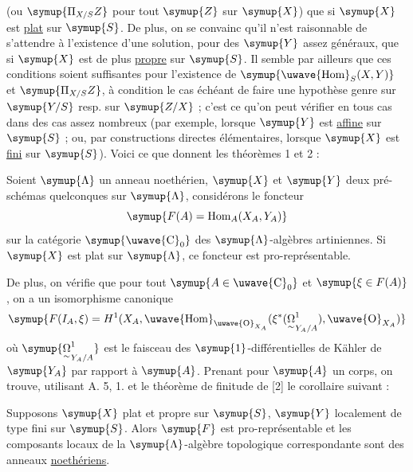 (ou $\symup{\Pi_{X/S}Z}$ pour tout $\symup{Z}$ sur $\symup{X}$) que si $\symup{X}$ est \uline{plat} sur $\symup{S}$. De plus,
on se convainc qu'il n'est raisonnable de s'attendre à l'existence d'une
solution, pour des $\symup{Y}$ assez généraux, que si $\symup{X}$ est de plus \uline{propre} sur $\symup{S}$.
Il semble par ailleurs que ces conditions soient suffisantes pour l'existence
de $\symup{\text{\uwave{Hom}}_S(X,Y)}$ et $\symup{\Pi_{X/S}Z}$, à condition le
cas échéant de faire une hypothèse genre  sur $\symup{Y/S}$ resp.
sur $\symup{Z/X}$ ; c'est ce qu'on peut vérifier en tous cas dans des cas assez
nombreux (par exemple, lorsque $\symup{Y}$ est \uline{affine} sur $\symup{S}$ ; ou, par constructions
directes élémentaires, lorsque $\symup{X}$ est \uline{fini} sur $\symup{S}$). Voici ce que donnent les
théorèmes 1 et 2 :

 Soient $\symup{\Lambda}$ un anneau noethérien, $\symup{X}$ et $\symup{Y}$
deux pré-schémas quelconques sur $\symup{\Lambda}$, considérons le foncteur
\[
  \symup{F(A)=\operatorname{Hom}_A(X_A,Y_A)}
\]
sur la catégorie $\symup{\text{\uwave{C}}_0}$ des $\symup{\Lambda}$-algèbres artiniennes. Si $\symup{X}$ est
plat sur $\symup{\Lambda}$, ce foncteur est pro-représentable.

De plus, on vérifie que pour tout $\symup{A\in\text{\uwave{C}}_0}$ et $\symup{\xi\in F(A)}$, on a un
isomorphisme canonique
\[
  \symup{F(I_A,\xi)=H^1(X_A,\text{\uwave{Hom}}_{\text{\uwave{O}}_{X_A}}(\xi^*(\mathord{\underset{\sim}{\Omega}}^1_{Y_A/A}),\text{\uwave{O}}_{X_A})}
\]
où $\symup{\mathord{\underset{\sim}{\Omega}}^1_{Y_A/A}}$ est le faisceau des $\symup{1}$-différentielles de Kähler de
$\symup{Y_A}$ par rapport à $\symup{A}$. Prenant pour $\symup{A}$ un corps, on trouve, utilisant
A. 5, 1. et le théorème de finitude de [2] le corollaire suivant :

 Supposons $\symup{X}$ plat et propre sur $\symup{S}$, $\symup{Y}$ localement de
type fini sur $\symup{S}$. Alors $\symup{F}$ est pro-représentable et les composants locaux de
la $\symup{\Lambda}$-algèbre topologique correspondante sont des anneaux \uline{noethériens}.

